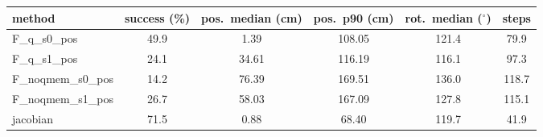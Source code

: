 \begin{tabular}{lccccc}
\hline
method & success (\%) & pos.\ median (cm) & pos.\ p90 (cm) & rot.\ median ($^\circ$) & steps \\
\hline
F\_q\_s0\_pos & 49.9 & 1.39 & 108.05 & 121.4 & 79.9 \\
F\_q\_s1\_pos & 24.1 & 34.61 & 116.19 & 116.1 & 97.3 \\
F\_noqmem\_s0\_pos & 14.2 & 76.39 & 169.51 & 136.0 & 118.7 \\
F\_noqmem\_s1\_pos & 26.7 & 58.03 & 167.09 & 127.8 & 115.1 \\
jacobian & 71.5 & 0.88 & 68.40 & 119.7 & 41.9 \\
\hline
\end{tabular}
